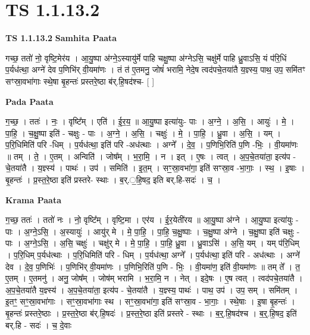 \documentclass[17pt]{extarticle}
\begin{document}
\section{ TS 1.1.13.2 }

\textbf{TS 1.1.13.2 } \newline
\textbf{Samhita Paata} \newline

गच्छ॒ ततो॑ नो॒ वृष्टि॒मेर॑य । आ॒यु॒ष्पा अ॑ग्ने॒ऽस्यायु॑र्मे पाहि चक्षु॒ष्पा अ॑ग्नेऽसि॒ चक्षु॑र्मे पाहि ध्रु॒वाऽसि॒ यं प॑रि॒धिं प॒र्यध॑त्था॒ अग्ने॑ देव प॒णिभि॑र् वी॒यमा॑णः । तं त॑ ए॒तमनु॒ जोषं॑ भरामि॒ नेदे॒ष त्वद॑पचे॒तया॑तै य॒ज्ञ्स्य॒ पाथ॒ उप॒ समि॑तꣳ सꣳस्रा॒वभा॑गाः स्थे॒षा बृ॒हन्तः॑ प्रस्तरे॒ष्ठा ब॑र्.हि॒षद॑श्च- [ ] \newline

\textbf{Pada Paata} \newline

ग॒च्छ॒ । ततः॑ । नः॒ । वृष्टि᳚म् । एति॑ । ई॒र॒य॒ ॥ आ॒यु॒ष्पा इत्या॑युः- पाः । अ॒ग्ने॒ । अ॒सि॒ । आयुः॑ । मे॒ । पा॒हि॒ । च॒क्षु॒ष्पा इति॑ - चक्षुः - पाः । अ॒ग्ने॒ । अ॒सि॒ । चक्षुः॑ । मे॒ । पा॒हि॒ । ध्रु॒वा । अ॒सि॒ । यम् । प॒रि॒धिमिति॑ परि -धिम् । प॒र्यध॑त्था॒ इति॑ परि -अध॑त्थाः । अग्ने᳚ । दे॒व॒ । प॒णिभि॒रिति॑ प॒णि -भिः॒ । वी॒यमा॑णः ॥ तम् । ते॒ । ए॒तम् । अन्विति॑ । जोष᳚म् । भ॒रा॒मि॒ । न । इत् । ए॒षः । त्वत् । अ॒प॒चे॒तया॑ता॒ इत्य॑प - चे॒तया॑तै । य॒ज्ञ्स्य॑ । पाथः॑ । उप॑ । समिति॑ । इ॒त॒म् । सꣳ॒॒स्रा॒वभा॑गा॒ इति॑ सꣳस्रा॒व -भा॒गाः॒ । स्थ॒ । इ॒षाः । बृ॒हन्तः॑ । प्र॒स्त॒रे॒ष्ठा इति॑ प्रस्तरे- स्थाः । ब॒र्.॒हि॒षद॒ इति बर्.हि-सदः॑ । च॒ ।  \newline


\textbf{Krama Paata} \newline

ग॒च्छ॒ ततः॑ । ततो॑ नः । नो॒ वृष्टि᳚म् । वृष्टि॒मा । एर॑य । ई॒र॒येती॑रय ॥ आ॒यु॒ष्पा अ॑ग्ने । आ॒यु॒ष्पा इत्या॑युः - पाः । अ॒ग्ने॒ऽसि॒ । अ॒स्यायुः॑ । आयु॑र् मे । मे॒ पा॒हि॒ । पा॒हि॒ च॒क्षु॒ष्पाः । च॒क्षु॒ष्पा अ॑ग्ने । च॒क्षु॒ष्पा इति॑ चक्षुः - पाः । अ॒ग्ने॒ऽसि॒ । अ॒सि॒ चक्षुः॑ । चक्षु॑र् मे । मे॒ पा॒हि॒ । पा॒हि॒ ध्रु॒वा । ध्रु॒वाऽसि॑ । अ॒सि॒ यम् । यम् प॑रि॒धिम् । प॒रि॒धिम् प॒र्यध॑त्थाः । प॒रि॒धिमिति॑ परि - धिम् । प॒र्यध॑त्था॒ अग्ने᳚ । प॒र्यध॑त्था॒ इति॑ परि - अध॑त्थाः । अग्ने॑ देव । दे॒व॒ प॒णिभिः॑ । प॒णिभि॑र् वी॒यमा॑णः । प॒णिभि॒रिति॑ प॒णि - भिः॒ । वी॒यमा॑ण॒ इति॑ वी॒यमा॑णः ॥ तम् ते᳚ । त॒ ए॒तम् । ए॒तमनु॑ । अनु॒ जोष᳚म् । जोष॑म् भरामि । भ॒रा॒मि॒ न । नेत् । इदे॒षः । ए॒ष त्वत् । त्वद॑पचे॒तया॑तै । अ॒प॒चे॒तया॑तै य॒ज्ञ्स्य॑ । अ॒प॒चे॒तया॑ता॒ इत्य॑प - चे॒तया॑तै । य॒ज्ञ्स्य॒ पाथः॑ । पाथ॒ उप॑ । उप॒ सम् । समि॑तम् । इ॒तꣳ॒॒ सꣳ॒॒स्रा॒वभा॑गाः । सꣳ॒॒स्रा॒वभा॑गाः स्थ । सꣳ॒॒स्रा॒वभा॑गा॒ इति॑ सꣳस्रा॒व - भा॒गाः॒ । स्थे॒षाः । इ॒षा बृ॒हन्तः॑ । बृ॒हन्तः॑ प्रस्तरे॒ष्ठाः । प्र॒स्त॒रे॒ष्ठा ब॑र्.हि॒षदः॑ । प्र॒स्त॒रे॒ष्ठा इति॑ प्रस्तरे - स्थाः । ब॒र्॒.हि॒षद॑श्च । ब॒र्॒.हि॒षद॒ इति॑ बर्.हि - सदः॑ । च॒ दे॒वाः \newline
\end{document}
